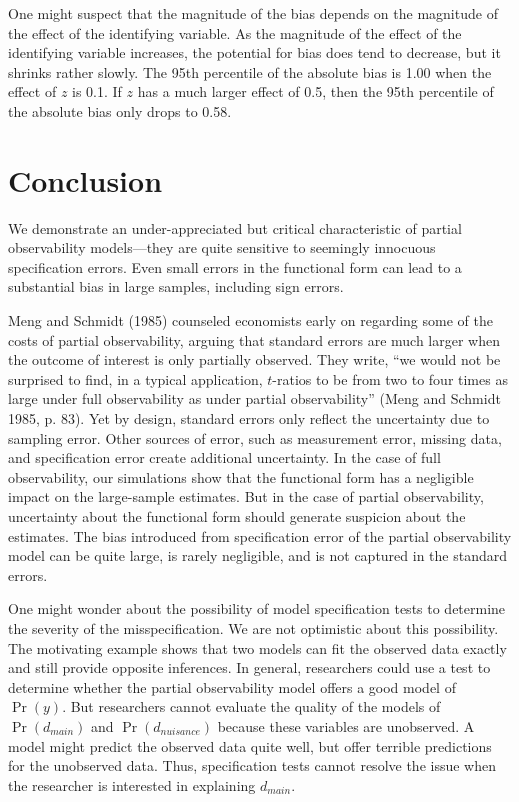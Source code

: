 \documentclass[10pt]{article}
\begin{document}
One might suspect that the magnitude of the bias depends on the magnitude of the effect of the identifying variable. As the magnitude of the effect of the identifying variable increases, the potential for bias does tend to decrease, but it shrinks rather slowly. The 95th percentile of the absolute bias is 1.00 when the effect of $z$ is 0.1. If $z$ has a much larger effect of 0.5, then the 95th percentile of the absolute bias only drops to 0.58.

\section*{Conclusion}

We demonstrate an under-appreciated but critical characteristic of partial observability models---they are quite sensitive to seemingly innocuous specification errors. 
Even small errors in the functional form can lead to a substantial bias in large samples, including sign errors.

Meng and Schmidt (1985) counseled economists early on regarding some of the costs of partial observability, arguing that standard errors are much larger when the outcome of interest is only partially observed. 
They write, ``we would not be surprised to find, in a typical application, $t$-ratios to be from two to four times as large under full observability as under partial observability'' (Meng and Schmidt 1985, p. 83). 
Yet by design, standard errors only reflect the uncertainty due to sampling error. 
Other sources of error, such as measurement error, missing data, and specification error create additional uncertainty. 
In the case of full observability, our simulations show that the functional form has a negligible impact on the large-sample estimates. 
But in the case of partial observability, uncertainty about the functional form should generate suspicion about the estimates. 
The bias introduced from specification error of the partial observability model can be quite large, is rarely negligible, and is not captured in the standard errors.

One might wonder about the possibility of model specification tests to determine the severity of the misspecification. 
We are not optimistic about this possibility. 
The motivating example shows that two models can fit the observed data exactly and still provide opposite inferences. 
In general, researchers could use a test to determine whether the partial observability model offers a good model of $\Pr(y)$. 
But researchers cannot evaluate the quality of the models of $\Pr(d_{main})$ and $\Pr(d_{nuisance})$ because these variables are unobserved.
A model might predict the observed data quite well, but offer terrible predictions for the unobserved data.
Thus, specification tests cannot resolve the issue when the researcher is interested in explaining $d_{main}$.
\end{document}
